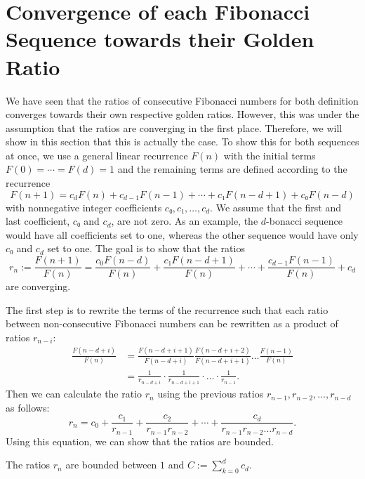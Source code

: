 \section{Convergence of each Fibonacci Sequence towards their Golden Ratio}
\label{sec:fib-conv}


We have seen that the ratios of consecutive Fibonacci numbers for both
definition converges towards their own respective golden ratios.
However, this was under the assumption that the ratios are converging in the first place.
Therefore, we will show in this section that this is actually the case.
To show this for both sequences at once, we use a general linear recurrence $F(n)$
with the initial terms $F(0) = ⋯ = F(d) = 1$ and the remaining terms are
defined according to the recurrence
\[
  F(n + 1) = c_d F(n) + c_{d-1} F(n-1) + ⋯ + c₁ F(n - d + 1) + c₀ F(n - d)
\]
with nonnegative integer coefficients $c₀, c₁, …, c_d$.
We assume that the first and last coefficient, $c₀$ and $c_d$, are not zero.
As an example, the $d$-bonacci sequence would have all coefficients set to one,
whereas the other sequence would have only $c₀$ and $c_d$ set to one.
The goal is to show that the ratios
\[
  r_n
  := \frac{F(n+1)}{F(n)}
  = \frac{c_0 F(n - d)}{F(n)} + \frac{c₁ F(n - d + 1)}{F(n)} + ⋯ + \frac{c_{d-1} F(n-1)}{F(n)} + c_d
\]
are converging.

The first step is to rewrite the terms of the recurrence such that each ratio
between non-consecutive Fibonacci numbers can be rewritten as a product of
ratios $r_{n-i}$:
\begin{align*}
  \frac{F(n - d + i)}{F(n)}
  & = \frac{F(n - d + i + 1)}{F(n - d + i)} \frac{F(n - d + i + 2)}{F(n - d + i + 1)} \dots \frac{F(n-1)}{F(n)} \\
  & = \frac{1}{r_{n - d + i}} · \frac{1}{r_{n - d + i + 1}} · \dots · \frac{1}{r_{n-1}}.
\end{align*}
Then we can calculate the ratio $r_n$ using the previous ratios $r_{n-1}, r_{n-2}, …, r_{n-d}$ as follows:
\[
  r_n = c_0 + \frac{c_1}{r_{n-1}} + \frac{c_2}{r_{n-1} r_{n-2}} + ⋯ + \frac{c_d}{r_{n-1} r_{n-2} \dots r_{n-d}}.
\]
Using this equation, we can show that the ratios are bounded.

\begin{lemma}
  \label{lem:fib-bounded}
  The ratios $r_n$ are bounded between $1$ and $C := ∑_{k=0}^d c_d$.
\end{lemma}

